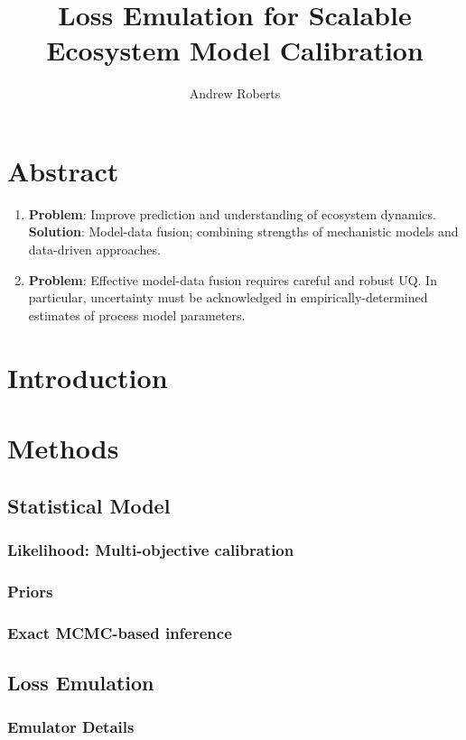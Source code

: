 \documentclass[12pt]{article}
\title{Loss Emulation for Scalable Ecosystem Model Calibration}
\author{Andrew Roberts}
\begin{document}
\maketitle
\tableofcontents
\newpage

\section{Abstract}
\begin{enumerate}
\item \textbf{Problem}: Improve prediction and understanding of ecosystem dynamics. \\
	\textbf{Solution}: Model-data fusion; combining strengths of mechanistic models and data-driven approaches. 
\item \textbf{Problem}: Effective model-data fusion requires careful and robust UQ. In particular, uncertainty must be acknowledged in empirically-determined estimates of process model parameters. 
\end{enumerate}


\section{Introduction}


\section{Methods}

\subsection{Statistical Model}
\subsubsection{Likelihood: Multi-objective calibration}
\subsubsection{Priors}
\subsubsection{Exact MCMC-based inference}

\subsection{Loss Emulation}
\subsubsection{Emulator Details}
\end{document}
